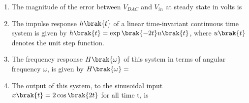 \documentclass[a4paper, 11pt]{article}
\begin{document}
\begin{enumerate}
    \hfill{}
    
    \item The magnitude of the error between $V_{DAC}$ and $V_{in}$ at steady state in volts is
    \begin{enumerate}
    \end{enumerate}
    
    \hfill{}
    
    \item[] The impulse response $h\brak{t}$ of a linear time-invariant continuous time system is given by $h\brak{t}=\exp\brak{-2t}u\brak{t}$, where $u\brak{t}$ denotes the unit step function.
    
    \item The frequency response $H\brak{\omega}$ of this system in terms of angular frequency $\omega$, is given by $H\brak{\omega}=$
    \begin{enumerate}
    \end{enumerate}
    
    \hfill{}
    
    \item The output of this system, to the sinusoidal input $x\brak{t} = 2\cos\brak{2t}$ for all time t, is
    \begin{enumerate}
    \end{enumerate}
    
    \hfill{}

\end{enumerate}
\end{document}
